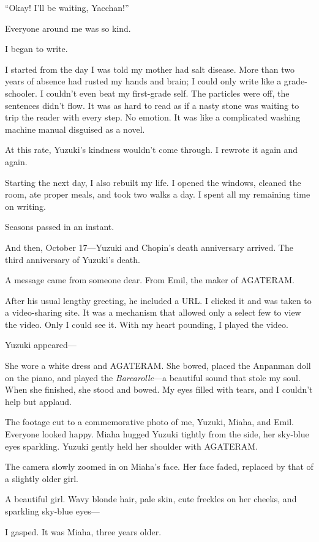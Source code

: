 \documentclass[
    a4paper,
    12pt,
    twoside,
    openany,
    UTF8,
    fontset=windows
]{ctexbook}
\begin{document}
``Okay! I'll be waiting, Yacchan!''

Everyone around me was so kind.

I began to write.

I started from the day I was told my mother had salt disease. More than two years of absence had rusted my hands and brain; I could only write like a grade-schooler. I couldn't even beat my first-grade self. The particles were off, the sentences didn't flow. It was as hard to read as if a nasty stone was waiting to trip the reader with every step. No emotion. It was like a complicated washing machine manual disguised as a novel.

At this rate, Yuzuki's kindness wouldn't come through. I rewrote it again and again.

Starting the next day, I also rebuilt my life. I opened the windows, cleaned the room, ate proper meals, and took two walks a day. I spent all my remaining time on writing.

Seasons passed in an instant.

And then, October 17---Yuzuki and Chopin's death anniversary arrived. The third anniversary of Yuzuki's death.

A message came from someone dear. From Emil, the maker of AGATERAM.

After his usual lengthy greeting, he included a URL. I clicked it and was taken to a video-sharing site. It was a mechanism that allowed only a select few to view the video. Only I could see it. With my heart pounding, I played the video.

Yuzuki appeared---

She wore a white dress and AGATERAM. She bowed, placed the Anpanman doll on the piano, and played the \textit{Barcarolle}---a beautiful sound that stole my soul. When she finished, she stood and bowed. My eyes filled with tears, and I couldn't help but applaud.

The footage cut to a commemorative photo of me, Yuzuki, Miaha, and Emil. Everyone looked happy. Miaha hugged Yuzuki tightly from the side, her sky-blue eyes sparkling. Yuzuki gently held her shoulder with AGATERAM.

The camera slowly zoomed in on Miaha's face. Her face faded, replaced by that of a slightly older girl.

A beautiful girl. Wavy blonde hair, pale skin, cute freckles on her cheeks, and sparkling sky-blue eyes---

I gasped. It was Miaha, three years older.
\end{document}
